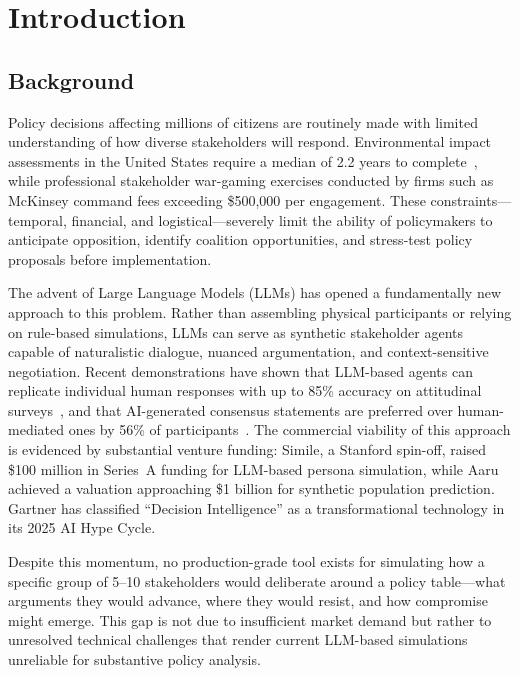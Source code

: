 \chapter{Introduction}

\section{Background}

Policy decisions affecting millions of citizens are routinely made with limited understanding of how diverse stakeholders will respond. Environmental impact assessments in the United States require a median of 2.2 years to complete~\cite{ceq2024}, while professional stakeholder war-gaming exercises conducted by firms such as McKinsey command fees exceeding \$500,000 per engagement. These constraints---temporal, financial, and logistical---severely limit the ability of policymakers to anticipate opposition, identify coalition opportunities, and stress-test policy proposals before implementation.

The advent of Large Language Models (LLMs) has opened a fundamentally new approach to this problem. Rather than assembling physical participants or relying on rule-based simulations, LLMs can serve as synthetic stakeholder agents capable of naturalistic dialogue, nuanced argumentation, and context-sensitive negotiation. Recent demonstrations have shown that LLM-based agents can replicate individual human responses with up to 85\% accuracy on attitudinal surveys~\cite{park2024generative}, and that AI-generated consensus statements are preferred over human-mediated ones by 56\% of participants~\cite{bakker2024habermas}. The commercial viability of this approach is evidenced by substantial venture funding: Simile, a Stanford spin-off, raised \$100 million in Series~A funding for LLM-based persona simulation, while Aaru achieved a valuation approaching \$1 billion for synthetic population prediction. Gartner has classified ``Decision Intelligence'' as a transformational technology in its 2025 AI Hype Cycle.

Despite this momentum, no production-grade tool exists for simulating how a specific group of 5--10 stakeholders would deliberate around a policy table---what arguments they would advance, where they would resist, and how compromise might emerge. This gap is not due to insufficient market demand but rather to unresolved technical challenges that render current LLM-based simulations unreliable for substantive policy analysis.


